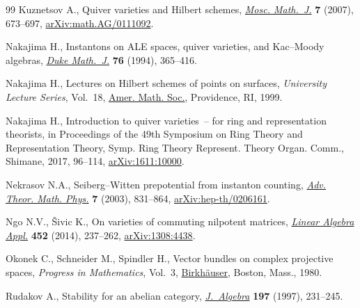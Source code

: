 \documentclass[pdftex]{sigma}
\numberwithin{equation}{section}
\begin{document}
\begin{thebibliography}{99}
Kuznetsov A., Quiver varieties and {H}ilbert schemes, \href{https://doi.org/10.17323/1609-4514-2007-7-4-673-697}{\textit{Mosc. Math.~J.}}
 \textbf{7} (2007), 673--697, \href{https://arxiv.org/abs/math.AG/0111092}{arXiv:math.AG/0111092}.

Nakajima H., Instantons on {ALE} spaces, quiver varieties, and {K}ac--{M}oody
 algebras, \href{https://doi.org/10.1215/S0012-7094-94-07613-8}{\textit{Duke Math.~J.}} \textbf{76} (1994), 365--416.

Nakajima H., Lectures on {H}ilbert schemes of points on surfaces,
 \textit{University Lecture Series}, Vol.~18, \href{https://doi.org/10.1090/ulect/018}{Amer. Math. Soc.}, Providence,
 RI, 1999.

Nakajima H., Introduction to quiver varieties~-- for ring and representation
 theorists, in Proceedings of the 49th {S}ymposium on {R}ing {T}heory and
 {R}epresentation {T}heory, Symp. Ring Theory Represent. Theory Organ. Comm.,
 Shimane, 2017, 96--114, \href{https://arxiv.org/abs/1611:10000}{arXiv:1611:10000}.

Nekrasov N.A., Seiberg--{W}itten prepotential from instanton counting,
 \href{http://projecteuclid.org/euclid.atmp/1111510432}{\textit{Adv. Theor. Math. Phys.}} \textbf{7} (2003), 831--864,
 \href{https://arxiv.org/abs/hep-th/0206161}{arXiv:hep-th/0206161}.

Ngo N.V., \v{S}ivic K., On varieties of commuting nilpotent matrices,
 \href{https://doi.org/10.1016/j.laa.2014.03.032}{\textit{Linear Algebra Appl.}} \textbf{452} (2014), 237--262,
 \href{https://arxiv.org/abs/1308:4438}{arXiv:1308:4438}.

Okonek C., Schneider M., Spindler H., Vector bundles on complex projective
 spaces, \textit{Progress in Mathematics}, Vol.~3, \href{https://doi.org/10.1007/978-3-0348-0151-5}{Birkh\"{a}user}, Boston,
 Mass., 1980.

Rudakov A., Stability for an abelian category, \href{https://doi.org/10.1006/jabr.1997.7093}{\textit{J.~Algebra}} \textbf{197}
 (1997), 231--245.

\end{thebibliography}\LastPageEnding
\end{document}
